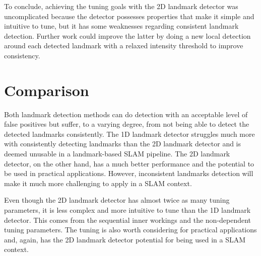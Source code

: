 To conclude, achieving the tuning goals with the 2D landmark detector was uncomplicated because the detector possesses properties that make it simple and intuitive to tune, but it has some weaknesses regarding consistent landmark detection. Further work could improve the latter by doing a new local detection around each detected landmark with a relaxed intensity threshold to improve consistency.

\section{Comparison}

Both landmark detection methods can do detection with an acceptable level of false positives but suffer, to a varying degree, from not being able to detect the detected landmarks consistently. The 1D landmark detector struggles much more with consistently detecting landmarks than the 2D landmark detector and is deemed unusable in a landmark-based SLAM pipeline. The 2D landmark detector, on the other hand, has a much better performance and the potential to be used in practical applications. However, inconsistent landmarks detection will make it much more challenging to apply in a SLAM context.

Even though the 2D landmark detector has almost twice as many tuning parameters, it is less complex and more intuitive to tune than the 1D landmark detector. This comes from the sequential inner workings and the non-dependent tuning parameters. The tuning is also worth considering for practical applications and, again, has the 2D landmark detector potential for being used in a SLAM context. 
